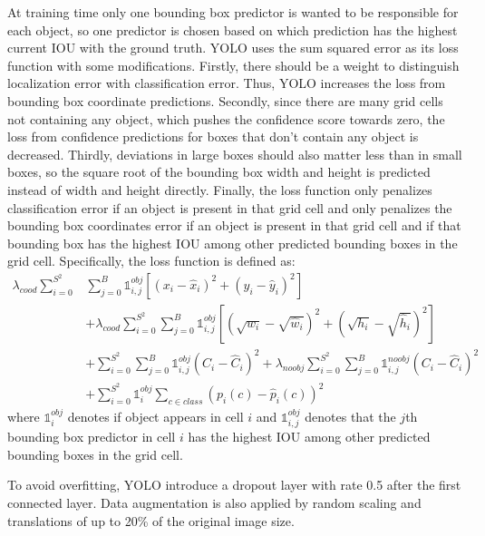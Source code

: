 At training time only one bounding box predictor is wanted to be responsible for each object, so one predictor is chosen based on which prediction has the highest current IOU with the ground truth. YOLO uses the sum squared error as its loss function with some modifications. Firstly, there should be a weight to distinguish localization error with classification error. Thus, YOLO increases the loss from bounding box coordinate predictions. Secondly, since there are many grid cells not containing any object, which pushes the confidence score towards zero, the loss from confidence predictions for boxes that don’t contain any object is decreased. Thirdly, deviations in large boxes should also matter less than in small boxes, so the square root of the bounding box width and height is predicted instead of width and height directly. Finally, the loss function only penalizes classification error if an object is present in that grid cell and only penalizes the bounding box coordinates error if an object is present in that grid cell and if that bounding box has the highest IOU among other predicted bounding boxes in the grid cell. Specifically, the loss function is defined as:
\begin{equation}
\begin{aligned}
 \lambda_{cood}\sum^{S^{2}}_{i=0}&\sum^{B}_{j=0}\mathbb{1}_{i,j}^{obj}\left[(x_{i} - \hat{x}_{i})^{2} + (y_{i} - \hat{y}_{i})^{2}\right]\\
  &+ \lambda_{cood}\sum^{S^{2}}_{i=0}\sum^{B}_{j=0}\mathbb{1}_{i,j}^{obj}\left[(\sqrt{w_{i}} - \sqrt{\hat{w}_{i}})^{2} + (\sqrt{h_{i}} - \sqrt{\hat{h}_{i}})^{2}\right]\\
   &+ \sum^{S^{2}}_{i=0}\sum^{B}_{j=0}\mathbb{1}_{i,j}^{obj}(C_{i} - \hat{C}_{i})^{2} +  \lambda_{noobj}\sum^{S^{2}}_{i=0}\sum^{B}_{j=0}\mathbb{1}_{i,j}^{noobj}(C_{i} - \hat{C}_{i})^{2}\\
    &+ \sum^{S^{2}}_{i=0}\mathbb{1}_{i}^{obj}\sum_{c\in{class}}(p_{i}(c) - \hat{p}_{i}(c))^{2}
\end{aligned}
\end{equation}
where $ \mathbb{1}_{i}^{obj} $ denotes if object appears in cell $ i $ and $ \mathbb{1}_{i,j}^{obj} $ denotes that the $j$th bounding box predictor in cell $ i $ has the highest IOU among other predicted bounding boxes in the grid cell.

To avoid overfitting, YOLO introduce a dropout layer with rate 0.5 after the first connected layer. Data augmentation is also applied by random scaling and translations of up to 20\% of the original image size.

